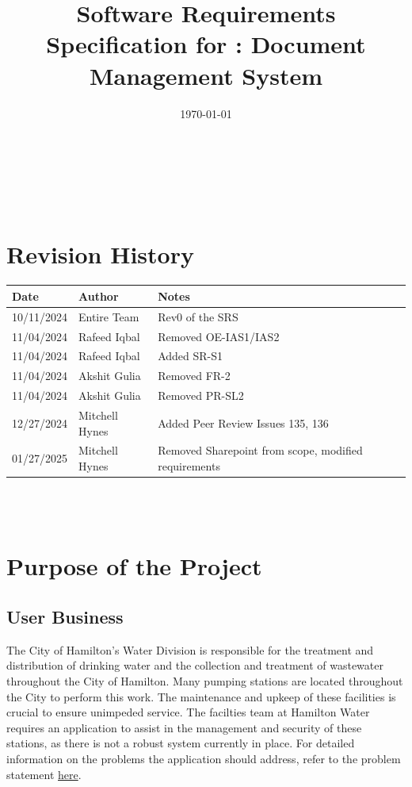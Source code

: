 \documentclass[12pt]{article}
\begin{document}
\title{Software Requirements Specification for \progname: Document
Management System}
\author{\authname}
\date{\today}

\maketitle

~\newpage


\tableofcontents

~\newpage
{}
\section*{Revision History}

\begin{tabularx}{\textwidth}{p{3cm}p{3cm}X}
  \toprule {\textbf{Date}} & {\textbf{Author}} & {\textbf{Notes}}\\
  \midrule
  10/11/2024 & Entire Team & Rev0 of the SRS\\
  11/04/2024 & Rafeed Iqbal & Removed OE-IAS1/IAS2\\
  11/04/2024 & Rafeed Iqbal & Added SR-S1\\
  11/04/2024 & Akshit Gulia & Removed FR-2\\
  11/04/2024 & Akshit Gulia & Removed PR-SL2\\
  12/27/2024 & Mitchell Hynes & Added Peer Review Issues 135, 136\\
  01/27/2025 & Mitchell Hynes & Removed Sharepoint from scope, modified requirements\\
  \bottomrule
\end{tabularx}
~\\

~\newpage
\section{Purpose of the Project}
\subsection{User Business}
The City of Hamilton's Water Division is responsible for the
treatment and distribution of drinking water and the collection and
treatment of wastewater throughout the City of Hamilton. Many pumping
stations are located throughout the City to perform this work. The
maintenance and upkeep of these facilities is crucial to ensure
unimpeded service. The facilties team at Hamilton Water requires an
application to assist in the management and security of these
stations, as there is not a robust system currently in place. For
detailed information on the problems the application should address,
refer to the problem statement
\href{https://github.com/Spitgranger/capstone/blob/main/docs/ProblemStatementAndGoals/ProblemStatement.pdf}{here}.
\end{document}
